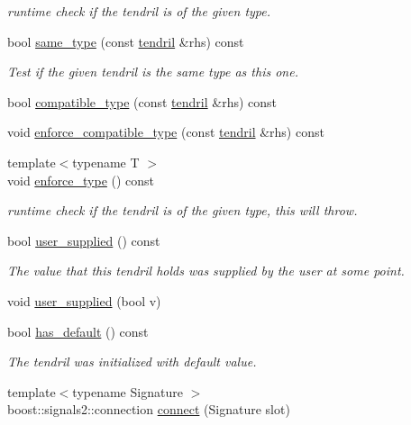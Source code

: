 \begin{DoxyCompactItemize}
\begin{DoxyCompactList}\small\item\em runtime check if the tendril is of the given type. \end{DoxyCompactList}\item 
bool \hyperlink{classecto_1_1tendril_a7974ef8e1d4cd1936a72c429c0f3dbf7}{same\-\_\-type} (const \hyperlink{classecto_1_1tendril}{tendril} \&rhs) const 
\begin{DoxyCompactList}\small\item\em \-Test if the given tendril is the same type as this one. \end{DoxyCompactList}\item 
bool \hyperlink{classecto_1_1tendril_a7033cbab493d0120443b69c951e5d26c}{compatible\-\_\-type} (const \hyperlink{classecto_1_1tendril}{tendril} \&rhs) const 
\item 
void \hyperlink{classecto_1_1tendril_ae856d0e8b9b6eb899e9b6a9b6472e231}{enforce\-\_\-compatible\-\_\-type} (const \hyperlink{classecto_1_1tendril}{tendril} \&rhs) const 
\item 
{\footnotesize template$<$typename T $>$ }\\void \hyperlink{classecto_1_1tendril_a9322a1212d70252a9a7c4f5192871475}{enforce\-\_\-type} () const 
\begin{DoxyCompactList}\small\item\em runtime check if the tendril is of the given type, this will throw. \end{DoxyCompactList}\item 
bool \hyperlink{classecto_1_1tendril_a8c46edfd052cdae0fef4705d5f5943c6}{user\-\_\-supplied} () const 
\begin{DoxyCompactList}\small\item\em \-The value that this tendril holds was supplied by the user at some point. \end{DoxyCompactList}\item 
void \hyperlink{classecto_1_1tendril_a3aa500420a52a0546e21105b3fb96ad0}{user\-\_\-supplied} (bool v)
\item 
bool \hyperlink{classecto_1_1tendril_af8a2ace0ae30083415116db06644ba17}{has\-\_\-default} () const 
\begin{DoxyCompactList}\small\item\em \-The tendril was initialized with default value. \end{DoxyCompactList}\item 
{\footnotesize template$<$typename Signature $>$ }\\boost\-::signals2\-::connection \hyperlink{classecto_1_1tendril_a94a24ca32acd13f83f5af41030a77fdf}{connect} (\-Signature slot)

\end{DoxyCompactItemize}
